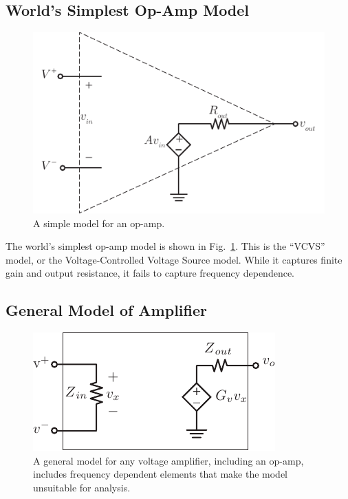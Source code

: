 \subsection{World's Simplest Op-Amp Model}
\begin{figure}[tb]
\begin{center}
\includegraphics[scale=1]{opamp_model}
\end{center}
\caption{A simple model for an op-amp.}
\label{fig:opamp_model}
\end{figure}

The world's simplest op-amp model is shown in Fig.~\ref{fig:opamp_model}. This is the ``VCVS'' model, or the Voltage-Controlled Voltage Source model.  While it captures finite gain and output resistance, it fails to capture frequency dependence.
\subsection{General Model of Amplifier}
\begin{figure}[tb]
\begin{center}
\includegraphics[scale=1]{vampmodelz}
\end{center}
\caption{A general model for any voltage amplifier, including an op-amp, includes frequency dependent elements that make the model unsuitable for analysis.}
\label{fig:vampmodelz}
\end{figure}


